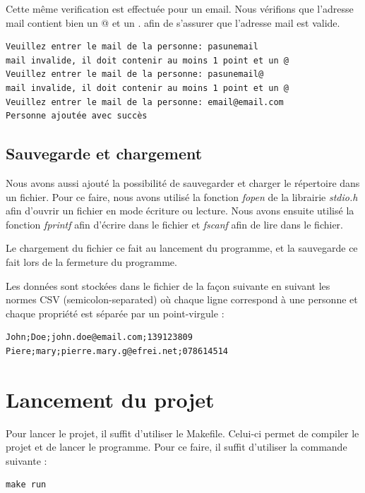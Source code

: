 \documentclass[12pt]{report}
\begin{document}
Cette même verification est effectuée pour un email. Nous vérifions que l'adresse mail contient bien un @ et un . afin de s'assurer que l'adresse mail est valide.

\begin{verbatim}
Veuillez entrer le mail de la personne: pasunemail
mail invalide, il doit contenir au moins 1 point et un @
Veuillez entrer le mail de la personne: pasunemail@
mail invalide, il doit contenir au moins 1 point et un @
Veuillez entrer le mail de la personne: email@email.com
Personne ajoutée avec succès
\end{verbatim}

\section{Sauvegarde et chargement}
Nous avons aussi ajouté la possibilité de sauvegarder et charger le répertoire dans un fichier. Pour ce faire, nous avons utilisé la fonction \textit{fopen} de la librairie \textit{stdio.h} afin d'ouvrir un fichier en mode écriture ou lecture. Nous avons ensuite utilisé la fonction \textit{fprintf} afin d'écrire dans le fichier et \textit{fscanf} afin de lire dans le fichier.

Le chargement du fichier ce fait au lancement du programme, et la sauvegarde ce fait lors de la fermeture du programme.

Les données sont stockées dans le fichier de la façon suivante en suivant les normes CSV (semicolon-separated) où chaque ligne correspond à une personne et chaque propriété est séparée par un point-virgule :
\begin{verbatim}
John;Doe;john.doe@email.com;139123809
Piere;mary;pierre.mary.g@efrei.net;078614514
\end{verbatim}

\chapter{Lancement du projet}
Pour lancer le projet, il suffit d'utiliser le Makefile. Celui-ci permet de compiler le projet et de lancer le programme. Pour ce faire, il suffit d'utiliser la commande suivante :
\begin{verbatim}
make run
\end{verbatim}
\end{document}
